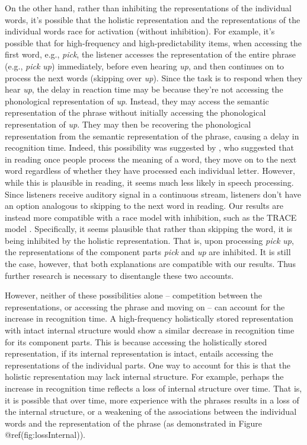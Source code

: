\documentclass[
  authoryear,
  preprint,
  1p,
  onecolumn]{elsarticle}
\begin{document}
On the other hand, rather than inhibiting the representations of the
individual words, it's possible that the holistic representation and the
representations of the individual words race for activation (without
inhibition). For example, it's possible that for high-frequency and
high-predictability items, when accessing the first word, e.g.,
\emph{pick}, the listener accesses the representation of the entire
phrase (e.g., \emph{pick up}) immediately, before even hearing
\emph{up}, and then continues on to process the next words (skipping
over \emph{up}). Since the task is to respond when they hear \emph{up},
the delay in reaction time may be because they're not accessing the
phonological representation of \emph{up}. Instead, they may access the
semantic representation of the phrase without initially accessing the
phonological representation of \emph{up}. They may then be recovering
the phonological representation from the semantic representation of the
phrase, causing a delay in recognition time. Indeed, this possibility
was suggested by \citet{healy1976}, who suggested that in reading once
people process the meaning of a word, they move on to the next word
regardless of whether they have processed each individual letter.
However, while this is plausible in reading, it seems much less likely
in speech processing. Since listeners receive auditory signal in a
continuous stream, listeners don't have an option analogous to skipping
to the next word in reading. Our results are instead more compatible
with a race model with inhibition, such as the TRACE model
\citep{mcclellandTRACEModelSpeech1984}. Specifically, it seems plausible
that rather than skipping the word, it is being inhibited by the
holistic representation. That is, upon processing \emph{pick up}, the
representations of the component parts \emph{pick} and \emph{up} are
inhibited. It is still the case, however, that both explanations are
compatible with our results. Thus further research is necessary to
disentangle these two accounts.

However, neither of these possibilities alone -- competition between the
representations, or accessing the phrase and moving on -- can account
for the increase in recognition time. A high-frequency holistically
stored representation with intact internal structure would show a
similar decrease in recognition time for its component parts. This is
because accessing the holistically stored representation, if its
internal representation is intact, entails accessing the representations
of the individual parts. One way to account for this is that the
holistic representation may lack internal structure. For example,
perhaps the increase in recognition time reflects a loss of internal
structure over time. That is, it is possible that over time, more
experience with the phrases results in a loss of the internal structure,
or a weakening of the associations between the individual words and the
representation of the phrase (as demonstrated in Figure
@ref(fig:lossInternal)).
\end{document}
